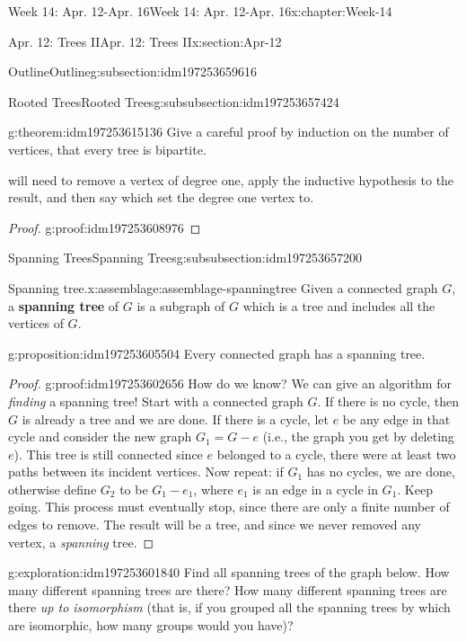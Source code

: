 \documentclass[oneside,10pt,]{book}
\newcommand{\terminology}[1]{\textbf{#1}}
\numberwithin{equation}{section}
\begin{document}
\begin{chapterptx}{Week 14: Apr. 12-Apr. 16}{}{Week 14: Apr. 12-Apr. 16}{}{}{x:chapter:Week-14}
\begin{sectionptx}{Apr. 12: Trees II}{}{Apr. 12: Trees II}{}{}{x:section:Apr-12}
\begin{subsectionptx}{Outline}{}{Outline}{}{}{g:subsection:idm197253659616}
\begin{subsubsectionptx}{Rooted Trees}{}{Rooted Trees}{}{}{g:subsubsection:idm197253657424}
\begin{theorem}{}{}{g:theorem:idm197253615136}
Give a careful proof by induction on the number of vertices, that every tree is bipartite.%
\par\smallskip%
\noindentYou will need to remove a vertex of degree one, apply the inductive hypothesis to the result, and then say which set the degree one vertex to.%
\end{theorem}
\begin{proof}{}{g:proof:idm197253608976}
\end{proof}
\end{subsubsectionptx}
%
%
\typeout{************************************************}
\typeout{************************************************}
%
\begin{subsubsectionptx}{Spanning Trees}{}{Spanning Trees}{}{}{g:subsubsection:idm197253657200}
\begin{assemblage}{Spanning tree.}{x:assemblage:assemblage-spanningtree}%
Given a connected graph \(G\), a \terminology{spanning tree} of \(G\) is a subgraph of \(G\) which is a tree and includes all the vertices of \(G\).%
\end{assemblage}
\begin{proposition}{}{}{g:proposition:idm197253605504}%
Every connected graph has a spanning tree.%
\end{proposition}
\begin{proof}{}{g:proof:idm197253602656}
How do we know?  We can give an algorithm for \emph{finding} a spanning tree!  Start with a connected graph \(G\).  If there is no cycle, then \(G\) is already a tree and we are done.  If there is a cycle, let \(e\) be any edge in that cycle and consider the new graph \(G_1 = G - e\) (i.e., the graph you get by deleting \(e\)).  This tree is still connected since \(e\) belonged to a cycle, there were at least two paths between its incident vertices.  Now repeat: if \(G_1\) has no cycles, we are done, otherwise define \(G_2\) to be \(G_1 - e_1\), where \(e_1\) is an edge in a cycle in \(G_1\).  Keep going.  This process must eventually stop, since there are only a finite number of edges to remove.  The result will be a tree, and since we never removed any vertex, a \emph{spanning} tree.%
\end{proof}
\begin{exploration}{}{g:exploration:idm197253601840}%
Find all spanning trees of the graph below. How many different spanning trees are there? How many different spanning trees are there \emph{up to isomorphism} (that is, if you grouped all the spanning trees by which are isomorphic, how many groups would you have)?%

\end{exploration}
\end{subsubsectionptx}
\end{subsectionptx}
\end{sectionptx}
\end{chapterptx}
\end{document}
